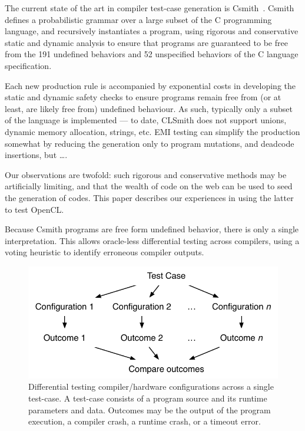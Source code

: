 The current state of the art in compiler test-case generation is Csmith~\cite{Yang2011}. Csmith defines a probabilistic grammar over a large subset of the C programming language, and recursively instantiates a program, using rigorous and conservative static and dynamic analysis to ensure that programs are guaranteed to be free from the 191 undefined behaviors and 52 unspecified behaviors of the C language specification.

Each new production rule is accompanied by exponential costs in developing the static and dynamic safety checks to ensure programs remain free from (or at least, are likely free from) undefined behaviour. As such, typically only a subset of the language is implemented --- to date, CLSmith does not support unions, dynamic memory allocation, strings, etc. EMI testing can simplify the production somewhat by reducing the generation only to program mutations, and deadcode insertions, but \ldots.

Our observations are twofold: such rigorous and conservative methods may be artificially limiting, and that the wealth of code on the web can be used to seed the generation of codes. This paper describes our experiences in using the latter to test OpenCL.

Because Csmith programs are free form undefined behavior, there is only a single interpretation. This allows oracle-less differential testing across compilers, using a voting heuristic to identify erroneous compiler outputs.

\begin{figure}
	\centering
	\includegraphics[width=.85\columnwidth]{img/difftest} %
	\caption{%
		Differential testing compiler/hardware configurations across a single test-case. A test-case consists of a program source and its runtime parameters and data. Outcomes may be the output of the program execution, a compiler crash, a runtime crash, or a timeout error.%
	}%
	\label{fig:difftest}
\end{figure}

